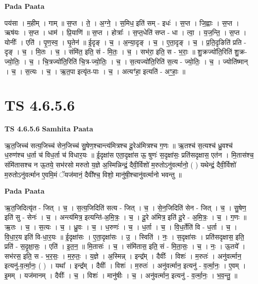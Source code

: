 \documentclass[17pt]{extarticle}
\begin{document}
\textbf{Pada Paata} \newline

पय॑सा । म॒हीम् । गाम् ॥ स॒प्त । ते॒ । अ॒ग्ने॒ । स॒मिध॒ इति॑ सम् - इधः॑ । स॒प्त । जि॒ह्वाः । स॒प्त । ऋष॑यः । स॒प्त । धाम॑ । प्रि॒याणि॑ ॥ स॒प्त । होत्राः᳚ । स॒प्त॒धेति॑ सप्त - धा । त्वा॒ । य॒ज॒न्ति॒ । स॒प्त । योनीः᳚ । एति॑ । पृ॒ण॒स्व॒ । घृ॒तेन॑ ॥ ई॒दृङ् । च॒ । अ॒न्या॒दृङ् । च॒ । ए॒ता॒दृङ् । च॒ । प्र॒ति॒दृङिति॑ प्रति - दृङ् । च॒ । मि॒तः । च॒ । संमि॑त॒ इति॒ सं - मि॒तः॒ । च॒ । सभ॑रा॒ इति॒ स - भ॒राः॒ ॥ शु॒क्रज्यो॑ति॒रिति॑ शु॒क्र-ज्यो॒तिः॒ । च॒ । चि॒त्रज्यो॑ति॒रिति॑ चि॒त्र-ज्यो॒तिः॒ । च॒ । स॒त्यज्यो॑ति॒रिति॑ स॒त्य - ज्यो॒तिः॒ । च॒ । ज्योति॑ष्मान् । च॒ । स॒त्यः । च॒ । ऋ॒त॒पा इत्यृ॑त-पाः । च॒ । अत्यꣳ॑हा॒ इत्यति॑ - अꣳ॒॒हाः॒ ॥  \newline




\section*{ TS 4.6.5.6 }

\textbf{TS 4.6.5.6 } \newline
\textbf{Samhita Paata} \newline

ऋ॒त॒जिच्च॑ सत्य॒जिच्च॑ सेन॒जिच्च॑ सु॒षेण॒श्चान्त्य॑मित्रश्च दू॒रेअ॑मित्रश्च ग॒णः ॥ ऋ॒तश्च॑ स॒त्यश्च॑ ध्रु॒वश्च॑ ध॒रुण॑श्च ध॒र्ता च॑ विध॒र्ता च॑ विधार॒यः ॥ ई॒दृक्षा॑स एता॒दृक्षा॑स ऊ॒ षुणः॑ स॒दृक्षा॑सः॒ प्रति॑सदृक्षास॒ एत॑न । मि॒तास॑श्च॒ संमि॑तासश्च न ऊ॒तये॒ सभ॑रसो मरुतो य॒ज्ञे अ॒स्मिन्निन्द्रं॒ दैवी॒र्विशो॑ म॒रुतोऽनु॑वर्त्मानो॒ ( ) यथेन्द्रं॒ दैवी॒र्विशो॑ म॒रुतोऽनु॑वर्त्मान ए॒वमि॒मं ॅयज॑मानं॒ दैवी᳚श्च॒ विशो॒ मानु॑षी॒श्चानु॑वर्त्मानो भवन्तु ॥ \newline

\textbf{Pada Paata} \newline

ऋ॒त॒जिदित्यृ॑त - जित् । च॒ । स॒त्य॒जिदिति॑ सत्य - जित् । च॒ । से॒न॒जिदिति॑ सेन - जित् । च॒ । सु॒षेण॒ इति॑ सु - सेनः॑ । च॒ । अन्त्य॑मित्र॒ इत्यन्ति॑-अ॒मि॒त्रः॒ । च॒ । दू॒रे अ॑मित्र॒ इति॑ दू॒रे - अ॒मि॒त्रः॒ । च॒ । ग॒णः ॥ ऋ॒तः । च॒ । स॒त्यः । च॒ । ध्रु॒वः । च॒ । ध॒रुणः॑ । च॒ । ध॒र्ता । च॒ । वि॒ध॒र्तेति॑ वि - ध॒र्ता । च॒ । वि॒धा॒र॒य इति॑ वि-धा॒र॒यः ॥ ई॒दृक्षा॑सः । ए॒ता॒दृक्षा॑सः । उ॒ । स्विति॑ । नः॒ । स॒दृक्षा॑सः । प्रति॑सदृक्षास॒ इति॒ प्रति॑ - स॒दृ॒क्षा॒सः॒ । एति॑ । इ॒त॒न॒ ॥ मि॒तासः॑ । च॒ । संमि॑तास॒ इति॒ सं - मि॒ता॒सः॒ । च॒ । नः॒ । ऊ॒तये᳚ । सभ॑रस॒ इति॒ स - भ॒र॒सः॒ । म॒रु॒तः॒ । य॒ज्ञे । अ॒स्मिन्न् । इन्द्र᳚म् । दैवीः᳚ । विशः॑ । म॒रुतः॑ । अनु॑वर्त्मान॒ इत्यनु॑-व॒र्त्मा॒नः॒ ( ) । यथा᳚ । इन्द्र᳚म् । दैवीः᳚ । विशः॑ । म॒रुतः॑ । अनु॑वर्त्मान॒ इत्यनु॑ - व॒र्त्मा॒नः॒ । ए॒वम् । इ॒मम् । यज॑मानम् । दैवीः᳚ । च॒ । विशः॑ । मानु॑षीः । च॒ । अनु॑वर्त्मान॒ इत्यनु॑ - व॒र्त्मा॒नः॒ । भ॒व॒न्तु॒ ॥  \newline
\end{document}
